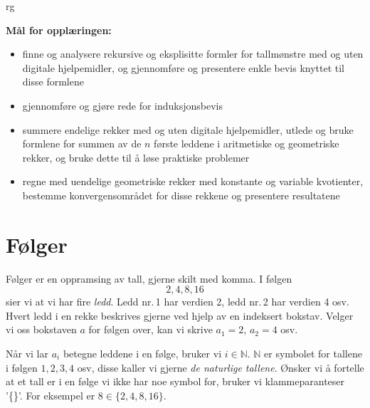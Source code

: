 



	
{rg}
\eqlen

\vspace{\parskip}
\textbf{Mål for opplæringen:}
\begin{itemize}
	\item finne og analysere rekursive og eksplisitte formler for tallmønstre med og uten digitale hjelpemidler, og gjennomføre og presentere enkle bevis knyttet til disse formlene
	\item gjennomføre og gjøre rede for induksjonsbevis
	\item summere endelige rekker med og uten digitale hjelpemidler, utlede og bruke formlene for summen av de $ n $ første leddene i aritmetiske og geometriske rekker, og bruke dette til å løse praktiske problemer
	\item regne med uendelige geometriske rekker med konstante og variable kvotienter, bestemme konvergensområdet for disse rekkene og presentere resultatene
\end{itemize}


\newpage

\section{Følger}
Følger er en oppramsing av tall, gjerne skilt med komma. I følgen 
\begin{equation}
2, 4, 8, 16  \label{folg}
\end{equation}
sier vi at vi har fire \textit{ledd}. Ledd nr.\,1 har verdien 2, ledd nr.\,2 har verdien 4 osv. Hvert ledd i en rekke beskrives gjerne ved hjelp av en indeksert bokstav. Velger vi oss bokstaven $ a $ for følgen over, kan vi skrive $ {a_1 =2} $, $ {a_2=4} $ osv.\vsk

Når vi lar $ a_i $ betegne leddene i en følge, bruker vi $ {i\in \mathbb{N}}$. $ \mathbb{N} $ er symbolet for tallene i følgen $ 1, 2, 3, 4$ osv, disse kaller vi gjerne \textit{de naturlige tallene}. Ønsker vi å fortelle at et tall er i en følge vi ikke har noe symbol for, bruker vi klammeparanteser '\{\}'. For eksempel er $ 8\in\lbrace2, 4, 8, 16\rbrace $. \vsk

